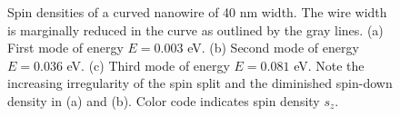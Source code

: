 \begin{figure}[h!]
  \centering
  \caption{Spin densities of a curved nanowire of 40 nm width. The wire width is marginally reduced in the curve as outlined by the gray lines. (a) First mode of energy $E=0.003$ eV. (b) Second mode of energy $E=0.036$ eV. (c) Third mode of energy $E=0.081$ eV. Note the increasing irregularity of the spin split and the diminished spin-down density in (a) and (b). Color code indicates spin density $s_z$.}
\end{figure}
